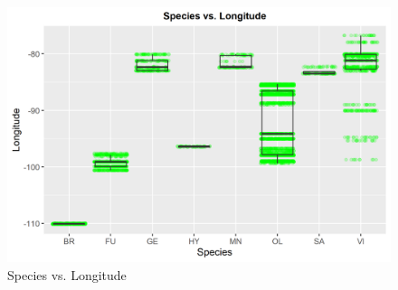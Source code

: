 \documentclass[letterpaper]{article}
\begin{document}
\begin{figure}[h]
\caption{Species vs. Longitude\label{fig:SLong}}
\centering
\includegraphics[width=0.7\paperwidth]{Species_v_Longitude}
\end{figure}
\end{document}
